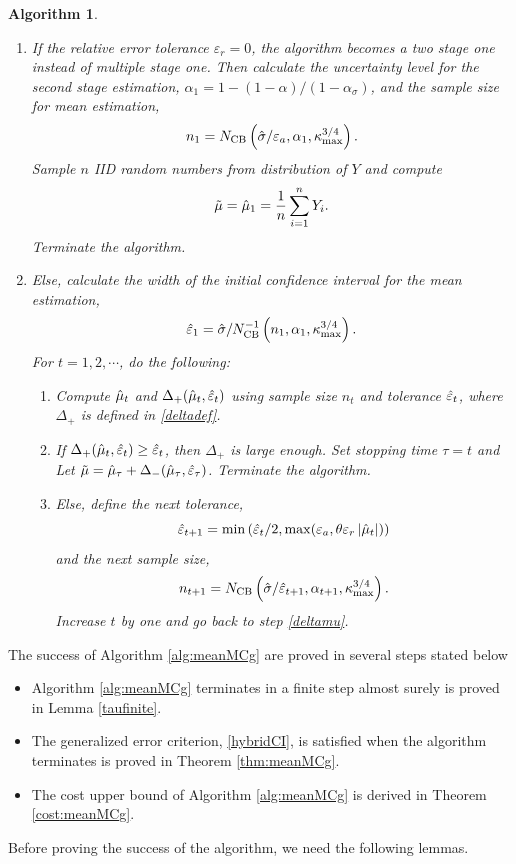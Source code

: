 \documentclass{iitthesis}
\newtheorem{theorem}{Theorem}[section]
\newtheorem{algorithm}[theorem]{Algorithm}
\theoremstyle{definition}
\begin{document}
\begin{algorithm}
\begin{enumerate}
\item If the relative error tolerance $\varepsilon_r=0$, the algorithm becomes a two stage one instead of multiple stage one. Then calculate the uncertainty level for the second stage estimation, $\alpha_1 = 1-(1-\alpha)/(1-\alpha_\sigma)$, and the sample size for mean estimation,
$$n_1 = N_{\text{CB}}\left(\hat{\sigma}/\varepsilon_a,\alpha_1,\kappa_{\max}^{3/4}\right).$$ 
Sample $n$ IID random numbers from distribution of $Y$ and compute $$\tilde{\mu} =\hat{\mu}_1 = \frac1n\sum_{i=1}^nY_i.$$
Terminate the algorithm.
\item Else, calculate the width of the initial confidence interval for the mean estimation,
\begin{align}\label{eps1def}
\hat{\varepsilon}_1=\hat{\sigma} /N_{\text{CB}}^{-1}\left(n_1,\alpha_1,\kappa_{\max}^{3/4}\right).
\end{align}
For $t = 1,2,\cdots$, do the following:
\begin{enumerate}
\item \label{deltamu}Compute $\hat{\mu}_t$ and $\Delta_{+}(\hat{\mu}_t,\hat{\varepsilon}_t)$ using sample size $n_t$ and tolerance $\hat{\varepsilon}_t$, where $\Delta_{+}$ is defined in \eqref{deltadef}.
\item If $\Delta_{+}(\hat{\mu}_t,\hat{\varepsilon}_t) \geq  \hat{\varepsilon}_t$, then $\Delta_{+}$ is large enough. Set stopping time $\tau = t$ and Let $\tilde{\mu} = \hat{\mu}_{\tau}+\Delta_{-}(\hat{\mu}_\tau,\hat{\varepsilon}_\tau)$. Terminate the algorithm.
\item Else, define the next tolerance, $$\hat{\varepsilon}_{t+1} = \min\left(\hat{\varepsilon}_t/2, \max(\varepsilon_a,\theta\varepsilon_r\left \lvert \hat{\mu}_t \right \rvert)\right)$$ and the next sample size, $$n_{t+1} = N_{\text{CB}}\left(\hat{\sigma}/\hat{\varepsilon}_{t+1},\alpha_{t+1},\kappa_{\max}^{3/4}\right).$$ Increase $t$ by one and go back to step \eqref{deltamu}. 
\end{enumerate}
\end{enumerate}
\end{algorithm}
The success of Algorithm \ref{alg:meanMCg} are proved in several steps stated below
\begin{itemize}
\item Algorithm \ref{alg:meanMCg} terminates in a finite step almost surely is proved in Lemma \ref{taufinite}.
\item The generalized error criterion, \eqref{hybridCI}, is satisfied when the algorithm terminates is proved in Theorem \ref{thm:meanMCg}.
\item The cost upper bound of Algorithm \ref{alg:meanMCg} is derived in Theorem \ref{cost:meanMCg}.
\end{itemize}
Before proving the success of the algorithm, we need the following lemmas.
\end{document}
